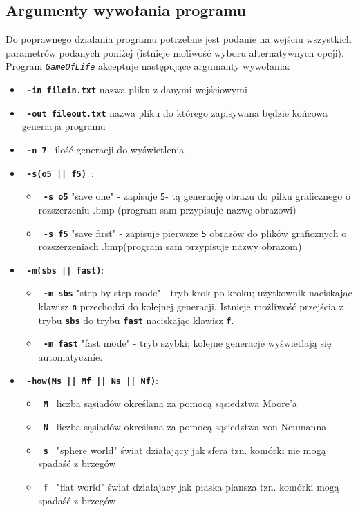 \documentclass[a4paper]{article}
\begin{document}
\subsection{Argumenty wywo\l{}ania programu}
\quad Do poprawnego dzia\l{}ania programu potrzebne jest podanie na wej\'sciu wszystkich parametr\'ow podanych poni\.zej (istnieje mo\.liwo\'s\'c wyboru alternatywnych opcji). Program \texttt{\textit{GameOfLife}} akceptuje nast\k{e}puj\k{a}ce argumanty wywo\l{}ania:
\begin{itemize}
	\item \textbf{\texttt{ -in filein.txt}} nazwa pliku z danymi wej\'sciowymi
	\item \textbf{\texttt{ -out fileout.txt}} nazwa pliku do kt\'orego zapisywana b\k{e}dzie ko\'ncowa generacja programu
	\item \textbf{\texttt{ -n 7 }} ilo\'s\'c generacji do wy\'swietlenia
	\item \textbf{\texttt{ -s(o5 || f5) }}:
		\begin{itemize}
			\item \textbf{\texttt{ -s o5}} "save one" - zapisuje \texttt{5}- t\k{a} generacj\k{e} obrazu do pilku graficznego o rozszerzeniu .bmp (program sam przypisuje nazw\k{e} obrazowi)
			\item \textbf{\texttt{ -s f5}} "save first" - zapisuje pierwsze \texttt{5} obraz\'ow do plik\'ow graficznych o rozszerzeniach .bmp(program sam przypisuje nazwy obrazom)

		\end{itemize}
	\item \textbf{\texttt{ -m(sbs || fast)}}:
		\begin{itemize}
			\item \textbf{\texttt{ -m sbs}} "step-by-step mode" - tryb krok po kroku; u\.zytkownik naciskaj\k{a}c klawisz \texttt{\textbf{n}} przechodzi do kolejnej generacji. 
				Istnieje mo\.zliwo\'s\'c przej\'scia z trybu \texttt{\textbf{sbs}} do trybu \texttt{\textbf{fast}} naciskaj\k{a}c klawisz \texttt{\textbf{f}}.
			\item \textbf{\texttt{ -m fast}} "fast mode" - tryb szybki; kolejne generacje wy\'swietlaj\k{a} si\k{e} automatycznie.
		\end{itemize}
	\item \textbf{\texttt{ -how(Ms || Mf || Ns || Nf)}}:
		\begin{itemize}
			\item \textbf{\texttt{ M }} liczba s\k{a}siad\'ow okre\'slana za pomoc\k{a} s\k{a}siedztwa Moore'a
			\item \textbf{\texttt{ N }} liczba s\k{a}siad\'ow okre\'slana za pomoc\k{a} s\k{a}siedztwa von Neumanna
			\item \textbf{\texttt{ s }} "sphere world" \'swiat dzia\l{}aj\k{a}cy jak sfera tzn. kom\'orki nie mog\k{a} spada\'s\'c z brzeg\'ow
			\item \textbf{\texttt{ f }} "flat world" \'swiat dzia\l{}ajacy jak p\l{}aska plansza tzn. kom\'orki mog\k{a} spada\'s\'c z brzeg\'ow\\


\end{itemize}
\end{itemize}
\end{document}

